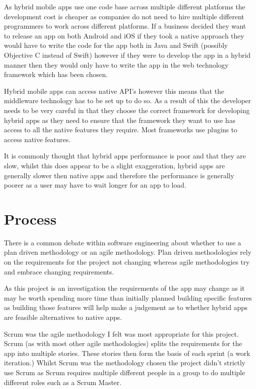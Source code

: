 As hybrid mobile apps use one code base across multiple different platforms the development cost is cheaper as companies do not need to hire multiple different programmers to work across different platforms. If a business decided they want to release an app on both Android and iOS if they took a native approach they would have to write the code for the app both in Java and Swift (possibly Objective C instead of Swift) however if they were to develop the app in a hybrid manner then they would only have to write the app in the web technology framework which has been chosen.

Hybrid mobile apps can access native API's however this means that the middleware technology has to be set up to do so. As a result of this the developer needs to be very careful in that they choose the correct framework for developing hybrid apps as they need to ensure that the framework they want to use has access to all the native features they require. Most frameworks use plugins to access native features.

It is commonly thought that hybrid apps performance is poor and that they are slow, whilst this does appear to be a slight exaggeration, hybrid apps are generally slower then native apps and therefore the performance is generally poorer as a user may have to wait longer for an app to load.


\section{Process}
There is a common debate within software engineering about whether to use a plan driven methodology or an agile methodology. Plan driven methodologies rely on the requirements for the project not changing whereas agile methodologies try and embrace changing requirements.

As this project is an investigation the requirements of the app may change as it may be worth spending more time than initially planned building specific features as building those features will help make a judgement as to whether hybrid apps are feasible alternatives to native apps.

Scrum was the agile methodology I felt was most appropriate for this project. Scrum (as with most other agile methodologies) splits the requirements for the app into multiple stories. These stories then form the basis of each sprint (a work iteration.) Whilst Scrum was the methodology chosen the project didn't strictly use Scrum as Scrum requires multiple different people in a group to do multiple different roles such as a Scrum Master. 

